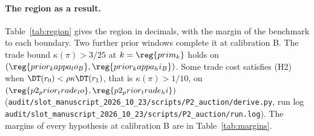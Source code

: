 \paragraph{The region as a result.}
Table~\ref{tab:region} gives the region in decimals, with the margin of the benchmark to each boundary. Two further
prior windows complete it at calibration B. The trade bound \(\kappa(\pi)>3/25\) at \(k=\reg{prim_k}\) holds on
\((\reg{prior_kappa_lo_B},\reg{prior_kappa_hi_B})\). Some trade cost satisfies (H2) when
\(\DT(r_0)<\rho\kappa\DT(r_1)\), that is \(\kappa(\pi)>1/10\), on \((\reg{p2_prior_trade_lo},\reg{p2_prior_trade_hi})\)
(\nolinkurl{audit/slot_manuscript_2026_10_23/scripts/P2_auction/derive.py}, run log
\nolinkurl{audit/slot_manuscript_2026_10_23/scripts/P2_auction/run.log}). The margins of every hypothesis at
calibration B are in Table~\ref{tab:margins}.

